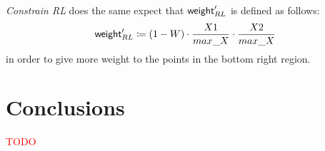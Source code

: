 \documentclass[8pt]{article}
\begin{document}
\emph{Constrain RL} does the same expect that $\textsf{weight}_{RL}^\prime$ is
defined as follows:
  \begin{align*}
    \textsf{weight}_{RL}^\prime \coloneqq 
      (1-W)\cdot \frac{X1}{max\_X} \cdot \frac{X2}{max\_X}
  \end{align*}
in order to give more weight to the points in the bottom right region.



\section{Conclusions}
\textcolor{red}{TODO}
\end{document}
